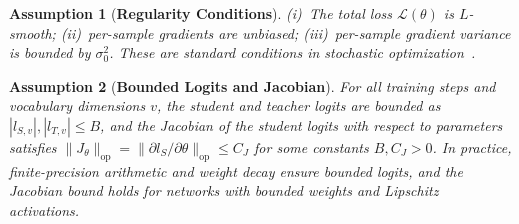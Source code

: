 \documentclass{article}
\newtheorem{assumption}{Assumption}
\begin{document}
\begin{assumption}[\textbf{Regularity Conditions}]
\label{asm:regularity}
(i)~The total loss $\mathcal{L}(\theta)$ is $L$-smooth; (ii)~per-sample gradients are unbiased; (iii)~per-sample gradient variance is bounded by $\sigma_0^2$. These are standard conditions in stochastic optimization~\citep{ghadimi2013sgd, bottou2018optimization}.
\end{assumption}

\begin{assumption}[\textbf{Bounded Logits and Jacobian}]
\label{asm:bounded_logits}
For all training steps and vocabulary dimensions $v$, the student and teacher logits are bounded as $|l_{S,v}|, |l_{T,v}| \leq B$, and the Jacobian of the student logits with respect to parameters satisfies $\|J_\theta\|_{\text{op}} = \|\partial l_S / \partial \theta\|_{\text{op}} \leq C_J$ for some constants $B, C_J > 0$. In practice, finite-precision arithmetic and weight decay ensure bounded logits, and the Jacobian bound holds for networks with bounded weights and Lipschitz activations.
\end{assumption}
\end{document}
